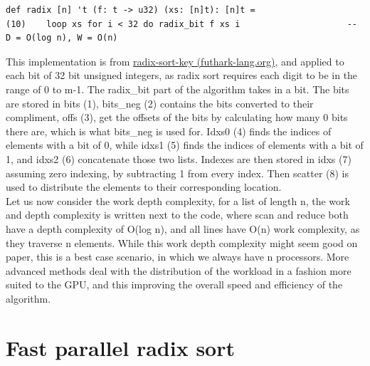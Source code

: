 \documentclass{article}
\begin{document}
\begin{itemize}
\begin{lstlisting}
def radix [n] 't (f: t -> u32) (xs: [n]t): [n]t = 
(10)    loop xs for i < 32 do radix_bit f xs i                     -- D = O(log n), W = O(n)
\end{lstlisting}

This implementation is from \href{https://futhark-lang.org/examples/radix-sort-key.html}{radix-sort-key (futhark-lang.org)}, and applied to each bit of 32 bit unsigned integers, as radix sort requires each digit to be in the range of 0 to m-1. The radix\_bit part of the algorithm takes in a bit. The bits are stored in bits (1), bits\_neg (2) contains the bits converted to their compliment, offs (3), get the offsets of the bits by calculating how many 0 bits there are, which is what bits\_neg is used for. Idxs0 (4) finds the indices of elements with a bit of 0, while idxs1 (5) finds the indices of elements with a bit of 1, and idxs2 (6) concatenate those two lists. Indexes are then stored in idxs (7) assuming zero indexing, by subtracting 1 from every index. Then scatter (8) is used to distribute the elements to their corresponding location.
\\
Let us now consider the work depth complexity, for a list of length n, the work and depth complexity is written next to the code, where scan and reduce both have a depth complexity of O(log n), and all lines have O(n) work complexity, as they traverse n elements. While this work depth complexity might seem good on paper, this is a best case scenario, in which we always have n processors. More advanced methods deal with the distribution of the workload in a fashion more suited to the GPU, and this improving the overall speed and efficiency of the algorithm. 
\end{itemize}

\section{Fast parallel radix sort}
\end{document}
